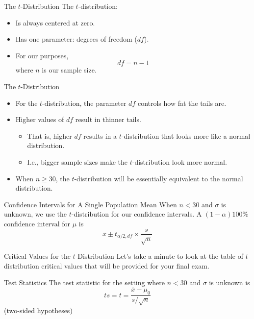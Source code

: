 \begin{frame}{The $t$-Distribution}
    The $t$-distribution:
    \begin{itemize}
        \item Is always centered at zero.
        \item Has one parameter: degrees of freedom ($df$).
        \item For our purposes,
        \[
            df = n-1
        \]
        where $n$ is our sample size.
    \end{itemize}
\end{frame}

\begin{frame}{The $t$-Distribution}
    \begin{itemize}
        \item For the $t$-distribution, the parameter $df$ controls how fat the tails are.
        \item Higher values of $df$ result in thinner tails.
        \begin{itemize}
            \item That is, higher $df$ results in a $t$-distribution that looks more like a normal distribution.
            \item I.e., bigger sample sizes make the $t$-distribution look more normal.
        \end{itemize}
        \item When $n \ge 30$, the $t$-distribution will be essentially equivalent to the normal distribution.
    \end{itemize}
\end{frame}

\begin{frame}{Confidence Intervals for A Single Population Mean}
    When $n < 30$ and $\sigma$ is unknown, we use the $t$-distribution for our confidence intervals. A $(1-\alpha)100\%$ confidence interval for $\mu$ is
    \[
        \bar{x} \pm t_{\alpha/2, df} \times \frac{s}{\sqrt{n}}
    \]
\end{frame}

\begin{frame}{Critical Values for the $t$-Distribution}
    Let's take a minute to look at the table of $t$-distribution critical values that will be provided for your final exam. 
\end{frame}

\begin{frame}{Test Statistics}
    The test statistic for the setting where $n < 30$ and $\sigma$ is unknown is
    \[
        ts = t = \frac{\bar{x}-\mu_0}{s/\sqrt{n}}
    \]
    (two-sided hypotheses)
\end{frame}

